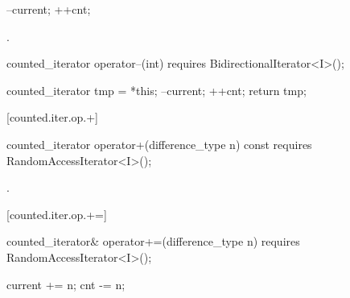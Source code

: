 \begin{addedblock}
\begin{itemdescr}
\pnum
\effects
\begin{codeblock}
--current;
++cnt;
\end{codeblock}

\pnum
\returns {}.
\end{itemdescr}

%
%
\begin{itemdecl}
  counted_iterator operator--(int)
    requires BidirectionalIterator<I>();
\end{itemdecl}

\begin{itemdescr}
\pnum
\effects
\begin{codeblock}
counted_iterator tmp = *this;
--current;
++cnt;
return tmp;
\end{codeblock}
\end{itemdescr}

[counted.iter.op.+]{}

%
%
\begin{itemdecl}
  counted_iterator operator+(difference_type n) const
    requires RandomAccessIterator<I>();
\end{itemdecl}

\begin{itemdescr}
\pnum
\requires {}

\pnum
\returns {}.
\end{itemdescr}

[counted.iter.op.+=]{}

%
%
\begin{itemdecl}
  counted_iterator& operator+=(difference_type n)
    requires RandomAccessIterator<I>();
\end{itemdecl}

\begin{itemdescr}
\pnum
\requires {}

\pnum
\effects
\begin{codeblock}
current += n;
cnt -= n;
\end{codeblock}


\end{itemdescr}
\end{addedblock}

